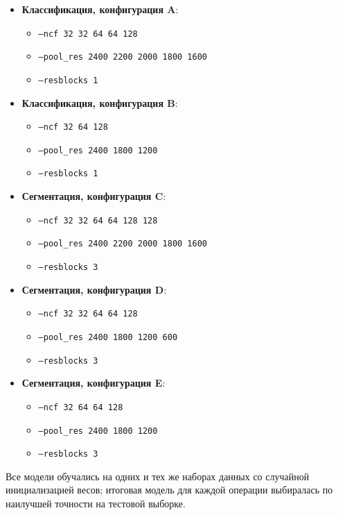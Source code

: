 \begin{itemize}
    \item \textbf{Классификация, конфигурация A}: 
        \begin{itemize}
            \item \texttt{--ncf 32 32 64 64 128}
            \item \texttt{--pool\_res 2400 2200 2000 1800 1600}
            \item \texttt{--resblocks 1}
        \end{itemize}
    \item \textbf{Классификация, конфигурация B}: 
        \begin{itemize}
            \item \texttt{--ncf 32 64 128}
            \item \texttt{--pool\_res 2400 1800 1200}
            \item \texttt{--resblocks 1}
        \end{itemize}
    \item \textbf{Сегментация, конфигурация C}: 
        \begin{itemize}
            \item \texttt{--ncf 32 32 64 64 128 128}
            \item \texttt{--pool\_res 2400 2200 2000 1800 1600}
            \item \texttt{--resblocks 3}
        \end{itemize}
    \item \textbf{Сегментация, конфигурация D}: 
        \begin{itemize}
            \item \texttt{--ncf 32 32 64 64 128}
            \item \texttt{--pool\_res 2400 1800 1200 600}
            \item \texttt{--resblocks 3}
        \end{itemize}
    \item \textbf{Сегментация, конфигурация E}: 
        \begin{itemize}
            \item \texttt{--ncf 32 64 64 128}
            \item \texttt{--pool\_res 2400 1800 1200}
            \item \texttt{--resblocks 3}
        \end{itemize}
\end{itemize}

Все модели обучались на одних и тех же наборах данных со случайной инициализацией весов; итоговая модель для каждой операции выбиралась по наилучшей точности на тестовой выборке.





